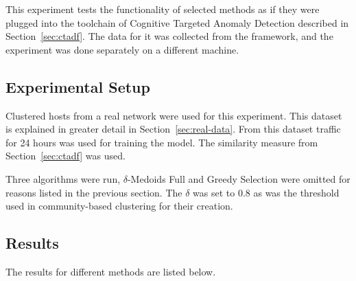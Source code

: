 \documentclass[thesis=B,english]{FITthesis}[2012/10/20]
\begin{document}
This experiment tests the functionality of selected methods as if they were plugged into the toolchain of Cognitive Targeted Anomaly Detection described in Section~\ref{sec:ctadf}.
The data for it was collected from the framework, and the experiment was done separately on a different machine.

\subsection{Experimental Setup}
Clustered hosts from a real network were used for this experiment.
This dataset is explained in greater detail in Section~\ref{sec:real-data}.
From this dataset traffic for 24 hours was used for training the model.
The similarity measure from Section~\ref{sec:ctadf} was used.

Three algorithms were run, $\delta$-Medoids Full and Greedy Selection were omitted for reasons listed in the previous section.
The $\delta$ was set to 0.8 as was the threshold used in community-based clustering for their creation.

\subsection{Results}

The results for different methods are listed below.
\end{document}
